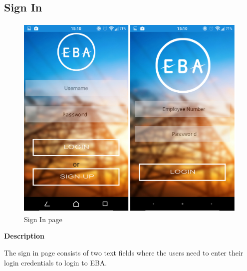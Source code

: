 \documentclass[12pt,a4paper,oneside]{report}
\begin{document}
\subsection{Sign In}
\begin{figure}[h]
	\begin{center}
		\includegraphics[width=12cm,height=10cm]{sslogin.jpg}
			\caption{Sign In page}
			\label{Sign In page}
	\end{center}
\end{figure}
\textbf{Description}
\par The sign in page consists of two text fields where the users need to enter their login credentials to login to EBA.

\newpage
\end{document}
